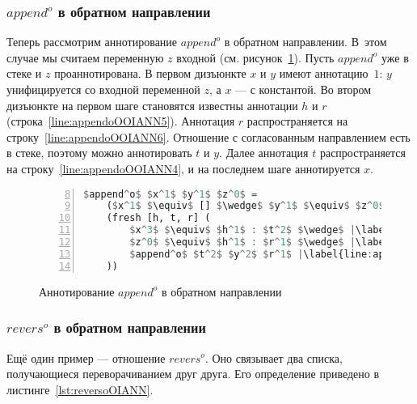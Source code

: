 
\subsubsection{$append^o$ в обратном направлении}

Теперь рассмотрим аннотирование $append^o$ в обратном направлении.
В~этом случае мы считаем переменную $z$ входной (см. рисунок~\ref{lst:appendoOOIANN}).
Пусть $append^o$ уже в стеке и $z$ проаннотирована.
В первом дизъюнкте $x$ и $y$ имеют аннотацию~$1$: $y$ унифицируется со входной переменной $z$, а $x$ --- с константой.
Во втором дизъюнкте на первом шаге становятся известны аннотации $h$ и $r$ (строка~\ref{line:appendoOOIANN5}).
Аннотация $r$ распространяется на строку~\ref{line:appendoOOIANN6}. 
Отношение с согласованным направлением есть в стеке, поэтому можно аннотировать $t$ и $y$.
Далее аннотация $t$ распространяется на строку~\ref{line:appendoOOIANN4}, и на последнем шаге аннотируется $x$. 

\begin{figure}[h!]
  \begin{center}
  \begin{minipage}{0.4\textwidth}
  \begin{lstlisting}[language=Haskell, frame=single, numbers=left,numberstyle=\small, firstnumber=8, escapechar=|]
  $append^o$ $x^1$ $y^1$ $z^0$ =
    ($x^1$ $\equiv$ [] $\wedge$ $y^1$ $\equiv$ $z^0$) $\vee$ |\label{line:appendoOOIANN2}|
    (fresh [h, t, r] (
        $x^3$ $\equiv$ $h^1$ : $t^2$ $\wedge$ |\label{line:appendoOOIANN4}|
        $z^0$ $\equiv$ $h^1$ : $r^1$ $\wedge$ |\label{line:appendoOOIANN5}|
        $append^o$ $t^2$ $y^2$ $r^1$ |\label{line:appendoOOIANN6}|
    ))
    \end{lstlisting}
  \end{minipage}
  \end{center}
  \caption{Аннотирование $append^o$ в обратном направлении}
  \label{lst:appendoOOIANN}
\end{figure}


\subsubsection{$revers^o$ в обратном направлении}

Ещё один пример --- отношение $revers^o$.
Оно связывает два списка, получающиеся переворачиванием друг друга.
Его определение приведено в листинге~\ref{lst:reversoOIANN}.

